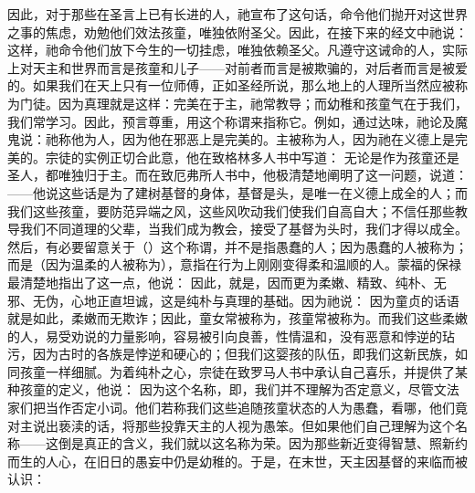因此，对于那些在圣言上已有长进的人，祂宣布了这句话，命令他们抛开对这世界之事的焦虑，劝勉他们效法孩童，唯独依附圣父。因此，在接下来的经文中祂说：  这样，祂命令他们放下今生的一切挂虑，唯独依赖圣父。凡遵守这诫命的人，实际上对天主和世界而言是孩童和儿子——对前者而言是被欺骗的，对后者而言是被爱的。如果我们在天上只有一位师傅，正如圣经所说，那么地上的人理所当然应被称为门徒。因为真理就是这样：完美在于主，祂常教导；而幼稚和孩童气在于我们，我们常学习。因此，预言尊重，用这个称谓来指称它。例如，通过达味，祂论及魔鬼说：祂称他为人，因为他在邪恶上是完美的。主被称为人，因为祂在义德上是完美的。宗徒的实例正切合此意，他在致格林多人书中写道：  无论是作为孩童还是圣人，都唯独归于主。而在致厄弗所人书中，他极清楚地阐明了这一问题，说道：  ——他说这些话是为了建树基督的身体，基督是头，是唯一在义德上成全的人；而我们这些孩童，要防范异端之风，这些风吹动我们使我们自高自大；不信任那些教导我们不同道理的父辈，当我们成为教会，接受了基督为头时，我们才得以成全。然后，有必要留意关于（）这个称谓，并不是指愚蠢的人；因为愚蠢的人被称为；而是（因为温柔的人被称为），意指在行为上刚刚变得柔和温顺的人。蒙福的保禄最清楚地指出了这一点，他说：  因此，就是，因而更为柔嫩、精致、纯朴、无邪、无伪，心地正直坦诚，这是纯朴与真理的基础。因为祂说：  因为童贞的话语就是如此，柔嫩而无欺诈；因此，童女常被称为，孩童常被称为。而我们这些柔嫩的人，易受劝说的力量影响，容易被引向良善，性情温和，没有恶意和悖逆的玷污，因为古时的各族是悖逆和硬心的；但我们这婴孩的队伍，即我们这新民族，如同孩童一样细腻。为着纯朴之心，宗徒在致罗马人书中承认自己喜乐，并提供了某种孩童的定义，他说：  因为这个名称，即，我们并不理解为否定意义，尽管文法家们把当作否定小词。他们若称我们这些追随孩童状态的人为愚蠢，看哪，他们竟对主说出亵渎的话，将那些投靠天主的人视为愚笨。但如果他们自己理解为这个名称——这倒是真正的含义，我们就以这名称为荣。因为那些新近变得智慧、照新约而生的人心，在旧日的愚妄中仍是幼稚的。于是，在末世，天主因基督的来临而被认识： \par

